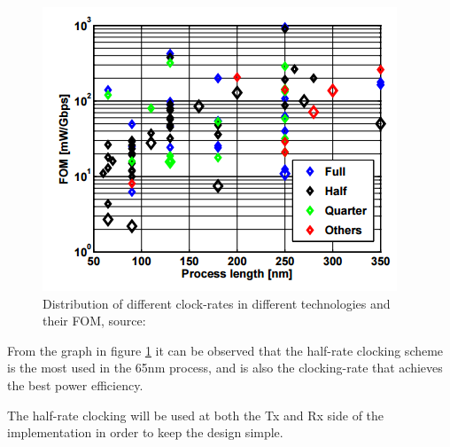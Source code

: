 \begin{figure}[H]
\begin{center}
\includegraphics[scale=1.2]{img/clock1}
\caption{Distribution of different clock-rates in different technologies and their FOM, source: ~\cite{rajesh2011a}}
\label{fig:graph1}
\end{center}
\end{figure}

From the graph in figure \ref{fig:graph1} it can be observed that the half-rate clocking scheme is the most used in the 65nm process, and is also the clocking-rate that achieves the best power efficiency.

The half-rate clocking will be used at both the Tx and Rx side of the implementation in order to keep the design simple.